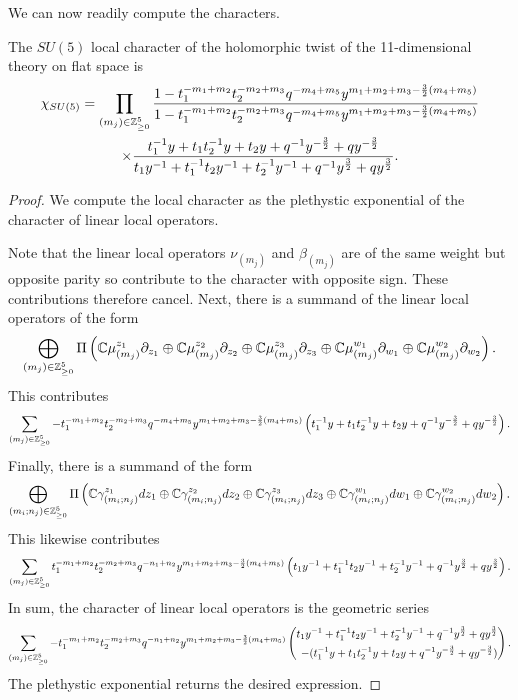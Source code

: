 We can now readily compute the characters.
\begin{prop}
The $SU(5)$ local character of the holomorphic twist of the 11-dimensional theory on flat space is
\begin{multline}
\chi_{SU(5)} = 
\prod_ {(m_j)\in \mathbb{Z}^5_{\geq 0}} \frac{1- t_1^{-m_1+m_2}t_2^{-m_2+m_3}q^{-m_4+m_5}y^{m_1+m_2+m_3-\frac 3 2 (m_4+m_5)}}{1- t_1^{-m_1+m_2}t_2^{-m_2+m_3}q^{-m_4+m_5}y^{m_1+m_2+m_3-\frac 3 2 (m_4+m_5)} }
\\ 
\times \frac{t_1^{-1}y + t_1t_2^{-1}y + t_2y + q^{-1}y^{-\frac 3 2} + qy^{-\frac 3 2}}{t_1y^{-1} + t_1^{-1}t_2y^{-1} + t_2^{-1}y^{-1} + q^{-1}y^{\frac 3 2} + qy^{\frac 3 2}}.
\end{multline}
\end{prop}
\begin{proof}
We compute the local character as the plethystic exponential of the character of linear local operators. 

Note that the linear local operators $ \nu_{(m_j)}$ and $\beta_{(m_j)}$ are of the same weight but opposite parity so contribute to the character with opposite sign. These contributions therefore cancel. Next, there is a summand of the linear local operators of the form 
\[
\bigoplus _{(m_j)\in \mathbb{Z}^5_{\geq 0 }} \Pi \left ( \mathbb{C}\mu^{z_1}_{(m_j)}\partial_{z_1}\oplus \mathbb{C}\mu^{z_2}_{(m_j)}\partial_{z_2}\oplus \mathbb{C}\mu^{z_3}_{(m_j)}\partial_{z_3}\oplus\mathbb{C}\mu^{w_1}_{(m_j)}\partial_{w_1}\oplus \mathbb{C}\mu^{w_2}_{(m_j)}\partial_{w_2}\right).
\] 
This contributes 
\[
\sum_{(m_j)\in \mathbb{Z}^5_{\geq 0 }}- t_1^{-m_1+m_2}t_2^{-m_2+m_3}q^{-m_4+m_5}y^{m_1+m_2+m_3-\frac 3 2 (m_4+m_5)}\left (t_1^{-1}y + t_1t_2^{-1}y + t_2y + q^{-1}y^{-\frac 3 2} + qy^{-\frac 3 2} \right).
\] 
Finally, there is a summand of the form 
\[
\bigoplus _{(m_i;n_j)\in \mathbb{Z}^5_{\geq 0 }} \Pi \left ( \mathbb{C}\gamma^{z_1}_{(m_i; n_j)}d{z_1}\oplus \mathbb{C}\gamma^{z_2}_{(m_i; n_j)}d{z_2}\oplus\mathbb{C}\gamma^{z_3}_{(m_i; n_j)}d{z_3}\oplus\mathbb{C}\gamma^{w_1}_{(m_i; n_j)}d{w_1}\oplus \mathbb{C}\gamma^{w_2}_{(m_i; n_j)}d {w_2}\right).
\] 
This likewise contributes 
\[
\sum_{(m_j)\in \mathbb{Z}^5_{\geq 0 }}t_1^{-m_1+m_2}t_2^{-m_2+m_3}q^{-n_1+n_2}y^{m_1+m_2+m_3-\frac 3 2 (m_4+m_5)}\left (t_1y^{-1} + t_1^{-1}t_2y^{-1} + t_2^{-1}y^{-1} + q^{-1}y^{\frac 3 2} + qy^{\frac 3 2} \right).
\] 
In sum, the character of linear local operators is the geometric series 
\[
\sum_{(m_j)\in \mathbb{Z}^5_{\geq 0 }}-t_1^{-m_1+m_2}t_2^{-m_2+m_3}q^{-n_1+n_2}y^{m_1+m_2+m_3-\frac 3 2 (m_4+m_5)}\left (\begin{aligned}t_1y^{-1} + t_1^{-1}t_2y^{-1} + t_2^{-1}y^{-1} + q^{-1}y^{\frac 3 2} + qy^{\frac 3 2} \\  - (t_1^{-1}y + t_1t_2^{-1}y + t_2y + q^{-1}y^{-\frac 3 2} + qy^{-\frac 3 2})\end{aligned}\right).
\] 
The plethystic exponential returns the desired expression.

\end{proof}
\fi

